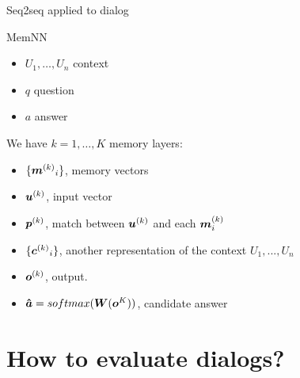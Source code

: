 \documentclass[10pt]{beamer}
\begin{document}
\begin{frame}{Seq2seq applied to dialog \cite{DBLP:journals/corr/VinyalsL15}}

\end{frame}


\begin{frame}{MemNN}
\begin{itemize}
\item $U_1, \dots, U_n$ context
\item $q$ question
\item $a$ answer
\end{itemize}

We have $k = 1, \dots, K$ memory layers: 

\begin{itemize}
\item $\{ {\bm{m}^{(k)}}_i\}$, memory vectors
\item $\bm{u}^{(k)}$, input vector
\item $\bm{p}^{(k)}$,  match between $\bm{u}^{(k)}$ and each $\bm{m}^{(k)}_i$
\item $\{ {\bm{c}^{(k)}}_i\}$, another representation of the context $U_1, ..., U_n$
\item $\bm{o}^{(k)}$, output.
\item $\bm{\hat{a}}= softmax(\bm{W}(\bm{o}^{K}))$, candidate answer
\end{itemize}
\end{frame}



\section{How to evaluate dialogs?}
\end{document}
